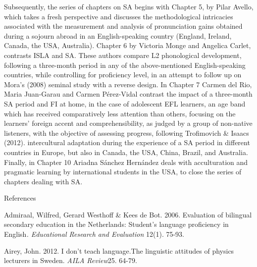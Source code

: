 \begin{styleStandard}
Subsequently, the series of chapters on SA begins with Chapter 5, by Pilar Avello, which takes a fresh perspective and discusses the methodological intricacies associated with the measurement and analysis of pronunciation gains obtained during a sojourn abroad in an English-speaking country (England, Ireland, Canada, the USA, Australia). Chapter 6 by Victoria Monge and Angelica Carlet, contrasts ISLA and SA. These authors compare L2 phonological development, following a three-month period in any of the above-mentioned English-speaking countries, while controlling for proficiency level, in an attempt to follow up on Mora’s (2008) seminal study with a reverse design. In Chapter 7 Carmen del Rio, Maria Juan-Garau and Carmen Pérez-Vidal contrast the impact of a three-month SA period and FI at home, in the case of adolescent EFL learners, an age band which has received comparatively less attention than others, focusing on the learners’ foreign accent and comprehensibility, as judged by a group of non-native listeners, with the objective of assessing progress, following Trofimovich \& Isaacs (2012). intercultural adaptation during the experience of a SA period in different countries in Europe, but also in Canada, the USA, China, Brazil, and Australia. Finally, in Chapter 10 Ariadna Sánchez Hernández deals with acculturation and pragmatic learning by international students in the USA, to close the series of chapters dealing with SA. 
\end{styleStandard}

\begin{stylelsSectioni}
References
\end{stylelsSectioni}


\begin{styleStandard}
Admiraal, Wilfred, Gerard Westhoff \& Kees de Bot. 2006. Evaluation of bilingual secondary education in the Netherlands: Student’s language proficiency in English\textit{. Educational Research and Evaluation }12(1). 75-93. \ 
\end{styleStandard}


\begin{styleStandard}
Airey, John. 2012. I don’t teach language.The linguistic attitudes of physics lecturers in Sweden.\textit{ AILA Review}\textstyleappleconvertedspace{ }25. 64-79.
\end{styleStandard}


